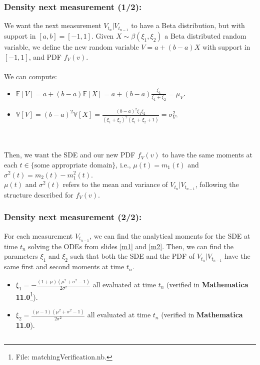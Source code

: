 \documentclass[aspectratio=169]{beamer}\usepackage[utf8]{inputenc}
\newcommand{\E}{\mathbb{E}}
\newcommand{\V}{\mathbb{V}}
\begin{document}
\begin{frame}\frametitle{Density next measurement (1/2):} \label{Tr}

We want the next measurement $V_{t_n}|V_{t_{n-1}}$ to have a Beta distribution, but with support in $[a,b]=[-1,1]$. Given $X\sim\beta(\xi_1,\xi_2)$ a \alert{Beta distributed random variable}, we define the new random variable $V=a+(b-a)X$ with support in $[-1,1]$, and PDF $f_V(v)$.\\
\quad\\
We can compute:
\begin{itemize}
\item $\E[V]=a+(b-a)\E[X]=a+(b-a)\frac{\xi_1}{\xi_1+\xi_2}=\mu_V$.
\item $\V[V]=(b-a)^2\V[X]=\frac{(b-a)^2\xi_1\xi_2}{(\xi_1+\xi_2)^2(\xi_1+\xi_2+1)}=\sigma^2_V$.
\end{itemize}
\quad\\
\quad\\
Then, we want the SDE and our new PDF $f_V(v)$ to have the same moments at each $t\in\{\text{some appropriate domain}\}$, i.e., $\mu(t)=m_1(t)$ and $\sigma^2(t)=m_2(t)-m_1^2(t)$.\\
$\mu(t)$ and $\sigma^2(t)$ refers to the mean and variance of $V_{t_n}|V_{t_{n-1}}$, following the structure described for $f_V(v)$.

\end{frame}


\begin{frame}\frametitle{Density next measurement (2/2):}\label{Tr2}

For each measurement $V_{t_{n-1}}$, we can find the analytical moments for the SDE at time $t_n$ solving the ODEs from slides {\color{blue}\ref{m1}} and {\color{blue}\ref{m2}}. Then, we can find the parameters $\xi_1$ and $\xi_2$ such that both the SDE and the PDF of $V_{t_n}|V_{t_{n-1}}$ have the same first and second moments at time $t_n$.
\begin{itemize}
\item $\xi_1=-\frac{(1+\mu)(\mu^2+\sigma^2-1)}{2\sigma^2}$ all evaluated at time $t_n$ (verified in \textbf{Mathematica 11.0}\footnote{File: {\color{blue}matchingVerification.nb}.}).
\item $\xi_2=\frac{(\mu-1)(\mu^2+\sigma^2-1)}{2\sigma^2}$ all evaluated at time $t_n$ (verified in \textbf{Mathematica 11.0}).
\end{itemize}

\begin{center}
\begin{tabular}{|c|}
\toprule
{\footnotesize

}\\
\bottomrule
\end{tabular}
\end{center}

\end{frame}
\end{document}
